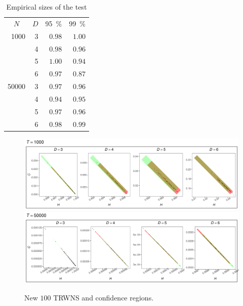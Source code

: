 \documentclass[alpha-refs]{wiley-article}
\begin{document}
\begin{table}[hbt]
\centering
\caption{Empirical sizes of the test}
\label{tab:result1}
\begin{tabular}{*{3}rr}
	\toprule
	\multicolumn{1}{c}{$N$} & \multicolumn{1}{c}{$D$} & \multicolumn{1}{c}{\SI{95}{\percent}} & \multicolumn{1}{c}{\SI{99}{\percent}}\\
	\cmidrule(lr){1-1}
	\cmidrule(lr){2-2}
	\cmidrule(lr){3-3}
	\cmidrule(lr){4-4}
	1000 & 3 & $0.98$ & $1.00$\\
	& 4 & $0.98$ & $0.96$\\
	& 5 & $1.00$ & $0.94$\\
	& 6 & $0.97$ & $0.87$\\
	\cmidrule(lr){1-4} 
	50000 & 3 & $0.97$ & $0.96$\\
	& 4 & $0.94$ & $0.95$\\
	& 5 & $0.97$ & $0.96$\\ 
	& 6 & $0.98$ & $0.99$\\ 
	\bottomrule
\end{tabular}
\end{table}

\begin{figure}[hbt]
\centering
\includegraphics[width=\linewidth]{Figures/RNG-1000.pdf}
\includegraphics[width=\linewidth]{Figures/RNG-50000.pdf}
\caption{New $100$ TRWNS and confidence regions.}
\label{fig:RNG}
\end{figure}
\end{document}
